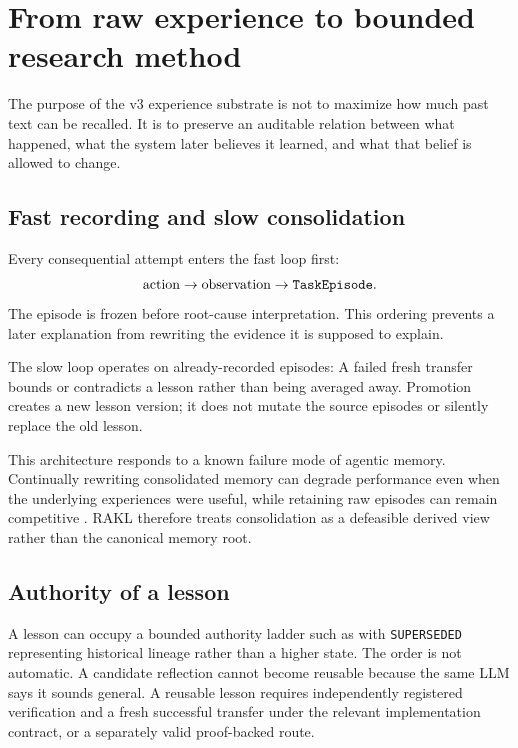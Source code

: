 \section{From raw experience to bounded research method}

The purpose of the v3 experience substrate is not to maximize how much past text can be recalled. It is to preserve an auditable relation between what happened, what the system later believes it learned, and what that belief is allowed to change.

\subsection{Fast recording and slow consolidation}

Every consequential attempt enters the fast loop first:
\[
\text{action}\rightarrow\text{observation}\rightarrow\texttt{TaskEpisode}{}.
\]
The episode is frozen before root-cause interpretation. This ordering prevents a later explanation from rewriting the evidence it is supposed to explain.

The slow loop operates on already-recorded episodes:
A failed fresh transfer bounds or contradicts a lesson rather than being averaged away. Promotion creates a new lesson version; it does not mutate the source episodes or silently replace the old lesson.

This architecture responds to a known failure mode of agentic memory. Continually rewriting consolidated memory can degrade performance even when the underlying experiences were useful, while retaining raw episodes can remain competitive \cite{zhang2026faultymemory}. RAKL therefore treats consolidation as a defeasible derived view rather than the canonical memory root.

\subsection{Authority of a lesson}

A lesson can occupy a bounded authority ladder such as
with \texttt{SUPERSEDED} representing historical lineage rather than a higher state. The order is not automatic. A candidate reflection cannot become reusable because the same LLM says it sounds general. A reusable lesson requires independently registered verification and a fresh successful transfer under the relevant implementation contract, or a separately valid proof-backed route.

